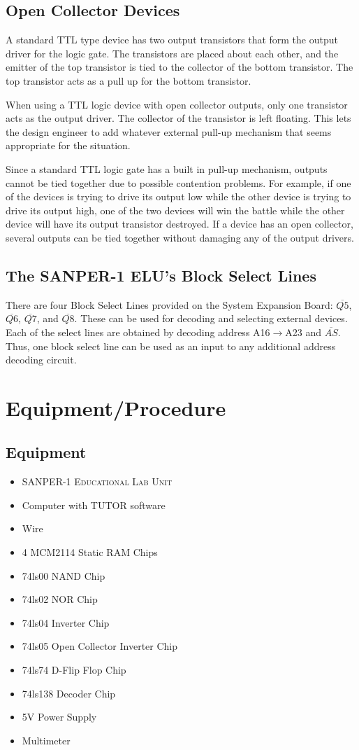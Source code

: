 \documentclass[12pt, twocolumn]{article}
\begin{document}
\subsection{Open Collector Devices}
A standard TTL type device has two output transistors that form the output driver for the logic gate. The transistors are placed about each other, and the emitter of the top transistor is tied to the collector of the bottom transistor. The top transistor acts as a pull up for the bottom transistor. 

When using a TTL logic device with open collector outputs, only one transistor acts as the output driver. The collector of the transistor is left floating. This lets the design engineer to add whatever external pull-up mechanism that seems appropriate for the situation.

Since a standard TTL logic gate has a built in pull-up mechanism, outputs cannot be tied together due to possible contention problems. For example, if one of the devices is trying to drive its output low while the other device is trying to drive its output high, one of the two devices will win the battle while the other device will have its output transistor destroyed\cite{expman}. If a device has an open collector, several outputs can be tied together without damaging any of the output drivers.

\subsection{The SANPER-1 ELU's Block Select Lines}
There are four Block Select Lines provided on the System Expansion Board: $\overline{Q5}$, $\overline{Q6}$, $\overline{Q7}$, and $\overline{Q8}$. These can be used for decoding and selecting external devices. Each of the select lines are obtained by decoding address A16$\to$A23 and $\overline{AS}$. Thus, one block select line can be used as an input to any additional address decoding circuit.
\section{Equipment/Procedure}
\subsection{Equipment}
\begin{itemize}
	\item \textsc{SANPER-1 Educational Lab Unit}
	\item Computer with TUTOR software
	\item Wire
	\item 4 MCM2114 Static RAM Chips
	\item 74ls00 NAND Chip
	\item 74ls02 NOR Chip
	\item 74ls04 Inverter Chip
	\item 74ls05 Open Collector Inverter Chip
	\item 74ls74 D-Flip Flop Chip
	\item 74ls138 Decoder Chip
	\item 5V Power Supply
	\item Multimeter
\end{itemize}
\end{document}
